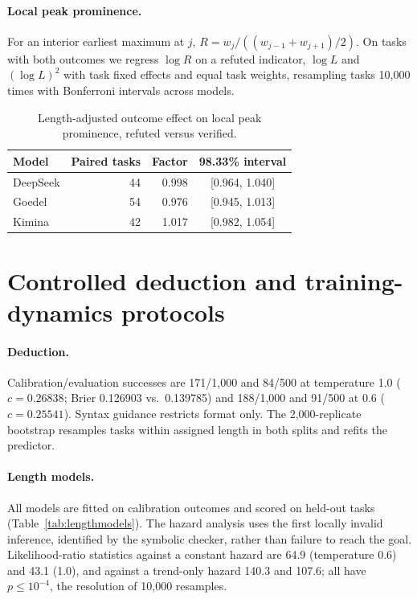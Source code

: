 \paragraph{Local peak prominence.} For an interior earliest maximum at $j$, $R=w_j/((w_{j-1}+w_{j+1})/2)$. On tasks with both outcomes we regress $\log R$ on a refuted indicator, $\log L$ and $(\log L)^2$ with task fixed effects and equal task weights, resampling tasks 10,000 times with Bonferroni intervals across models.

\begin{table}[h]
\caption{Length-adjusted outcome effect on local peak prominence, refuted versus verified.}
\label{tab:prominence}
\begin{center}
\small
\begin{tabular}{lrrc}
\toprule
Model & Paired tasks & Factor & 98.33\% interval\\
\midrule
DeepSeek & 44 & 0.998 & [0.964, 1.040]\\
Goedel & 54 & 0.976 & [0.945, 1.013]\\
Kimina & 42 & 1.017 & [0.982, 1.054]\\
\bottomrule
\end{tabular}
\end{center}
\end{table}

\section{Controlled deduction and training-dynamics protocols}\label{app:dynamics}

\paragraph{Deduction.} Calibration/evaluation successes are 171/1,000 and 84/500 at temperature 1.0 ($c=0.26838$; Brier 0.126903 vs.\ 0.139785) and 188/1,000 and 91/500 at 0.6 ($c=0.25541$). Syntax guidance restricts format only. The 2,000-replicate bootstrap resamples tasks within assigned length in both splits and refits the predictor.

\paragraph{Length models.} All models are fitted on calibration outcomes and scored on held-out tasks (Table~\ref{tab:lengthmodels}). The hazard analysis uses the first locally invalid inference, identified by the symbolic checker, rather than failure to reach the goal. Likelihood-ratio statistics against a constant hazard are 64.9 (temperature 0.6) and 43.1 (1.0), and against a trend-only hazard 140.3 and 107.6; all have $p\le10^{-4}$, the resolution of 10,000 resamples.

